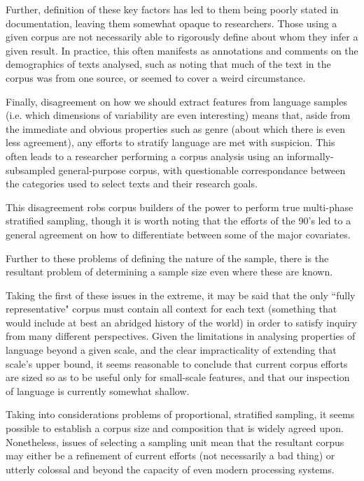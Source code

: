 Further, definition of these key factors has led to them being poorly stated in documentation, leaving them somewhat opaque to researchers.  Those using a given corpus are not necessarily able to rigorously define about whom they infer a given result.  In practice, this often manifests as annotations and comments on the demographics of texts analysed, such as noting that much of the text in the corpus was from one source, or seemed to cover a weird circumstance.



Finally, disagreement on how we should extract features from language samples (i.e. which dimensions of variability are even interesting) means that, aside from the immediate and obvious properties such as genre (about which there is even less agreement), any efforts to stratify language are met with suspicion.  This often leads to a researcher performing a corpus analysis using an informally-subsampled general-purpose corpus, with questionable correspondance between the categories used to select texts and their research goals.

This disagreement robs corpus builders of the power to perform true multi-phase stratified sampling, though it is worth noting that the efforts of the 90's led to a general agreement on how to differentiate between some of the major covariates.


Further to these problems of defining the nature of the sample, there is the resultant problem of determining a sample size even where these are known.  

Taking the first of these issues in the extreme, it may be said that the only ``fully representative" corpus must contain all context for each text (something that would include at best an abridged history of the world) in order to satisfy inquiry from many different perspectives.  Given the limitations in analysing properties of language beyond a given scale, and the clear impracticality of extending that scale's upper bound, it seems reasonable to conclude that current corpus efforts are sized so as to be useful only for small-scale features, and that our inspection of language is currently somewhat shallow.

Taking into considerations problems of proportional, stratified sampling, it seems possible to establish a corpus size and composition that is widely agreed upon.  Nonetheless, issues of selecting a sampling unit mean that the resultant corpus may either be a refinement of current efforts (not necessarily a bad thing) or utterly colossal and beyond the capacity of even modern processing systems.

